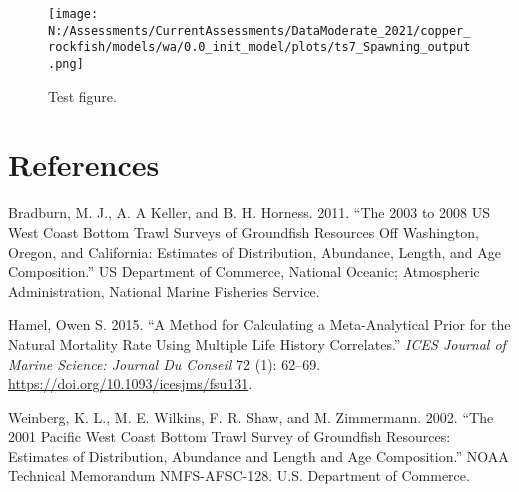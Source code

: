 \documentclass[11pt,
  english,
  a4paper,
]{article}
\begin{document}
\tagmcend\tagstructend


\begin{figure}
\centering
\texttt{[image: N:/Assessments/CurrentAssessments/DataModerate\_2021/copper\_rockfish/models/wa/0.0\_init\_model/plots/ts7\_Spawning\_output.png]}
\caption{Test figure.\label{fig:test}}
\end{figure}

\tagmcend\tagstructend

\clearpage


\hypertarget{references}{%
\section{References}\label{references}}

\leavevmode\tagmcend\tagstructend

\hypertarget{refs}{}
\begin{cslreferences}
\leavevmode\hypertarget{ref-bradburn_2003_2011}{}%
Bradburn, M. J., A. A Keller, and B. H. Horness. 2011. ``The 2003 to 2008 US West Coast Bottom Trawl Surveys of Groundfish Resources Off Washington, Oregon, and California: Estimates of Distribution, Abundance, Length, and Age Composition.'' US Department of Commerce, National Oceanic; Atmospheric Administration, National Marine Fisheries Service.

\leavevmode\hypertarget{ref-hamel_method_2015}{}%
Hamel, Owen S. 2015. ``A Method for Calculating a Meta-Analytical Prior for the Natural Mortality Rate Using Multiple Life History Correlates.'' \emph{ICES Journal of Marine Science: Journal Du Conseil} 72 (1): 62--69. \url{https://doi.org/10.1093/icesjms/fsu131}.

\leavevmode\hypertarget{ref-weinberg_2001_2002}{}%
Weinberg, K. L., M. E. Wilkins, F. R. Shaw, and M. Zimmermann. 2002. ``The 2001 Pacific West Coast Bottom Trawl Survey of Groundfish Resources: Estimates of Distribution, Abundance and Length and Age Composition.'' NOAA Technical Memorandum NMFS-AFSC-128. U.S. Department of Commerce.
\end{cslreferences}
\end{document}

